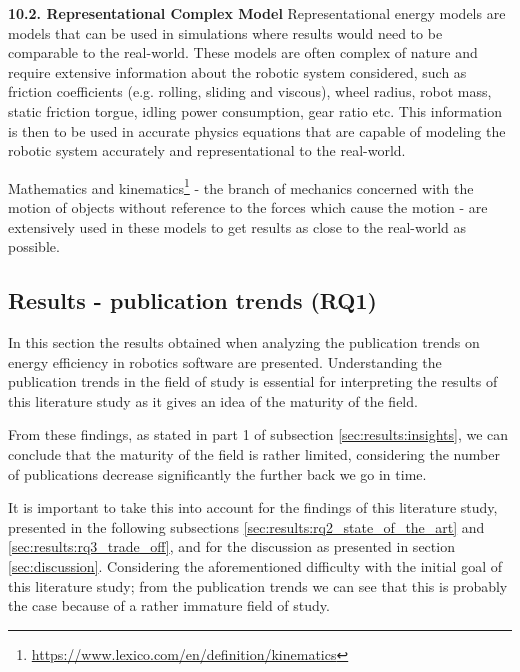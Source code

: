 \vspace{2mm} \noindent \textbf{10.2. Representational Complex Model}
Representational energy models are models that can be used in simulations where results would need to be comparable to the real-world.
These models are often complex of nature and require extensive information about the robotic system considered, such as
friction coefficients (e.g. rolling, sliding and viscous), wheel radius, robot mass, static friction torgue, 
idling power consumption, gear ratio etc.
This information is then to be used in accurate physics equations that are capable of modeling the robotic system accurately and
representational to the real-world.

Mathematics and kinematics\footnote{\url{https://www.lexico.com/en/definition/kinematics}} 
- the branch of mechanics concerned with the motion of objects without reference to the forces which cause the motion -
are extensively used in these models to get results as close to the real-world as possible.


\subsection{Results - publication trends (RQ1)}
\label{sec:results:rq1_pub_trends}

In this section the results obtained when analyzing the publication trends on energy efficiency in robotics software are presented.
Understanding the publication trends in the field of study is essential for interpreting the results of this literature study as it gives
an idea of the maturity of the field. 

\vspace{2mm}

From these findings, as stated in part 1 of subsection \ref{sec:results:insights}, we can conclude that the maturity of the field is rather limited,
considering the number of publications decrease significantly the further back we go in time.

\vspace{2mm}

It is important to take this into account for the findings of this literature study, presented in the following subsections 
\ref{sec:results:rq2_state_of_the_art} and \ref{sec:results:rq3_trade_off}, and for the discussion as presented in section \ref{sec:discussion}.
Considering the aforementioned difficulty with the initial goal of this literature study; from the publication trends we can see that this 
is probably the case because of a rather immature field of study.

